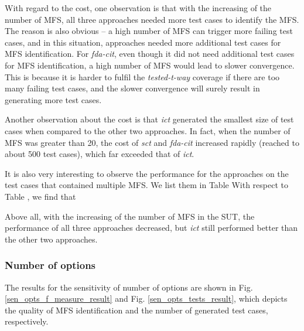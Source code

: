 \documentclass[10pt,journal,compsoc]{IEEEtran}
\begin{document}
With regard to the cost, one observation is that with the increasing of the number of MFS, all three approaches needed more test cases to identify the MFS. The reason is also obvious -- a high number of MFS can trigger more failing test cases, and in this situation, approaches needed more additional test cases for MFS identification. For \emph{fda-cit}, even though it did not need additional test cases for MFS identification, a high number of MFS would lead to slower convergence. This is because it is harder to fulfil the \emph{tested-t-way} coverage if there are too many failing test cases, and the slower convergence will surely result in generating more test cases.


Another observation about the cost is that \emph{ict} generated the smallest size of test cases when compared to the other two approaches. In fact, when the number of MFS was greater than 20, the cost of \emph{sct} and \emph{fda-cit} increased rapidly (reached to about 500 test cases), which far exceeded that of \emph{ict}.


{\color{blue}
It is also very interesting to observe the performance for the approaches on the test cases that contained multiple MFS. We list them in Table
With respect to Table , we find that

}



Above all, with the increasing of the number of MFS in the SUT, the performance of all three approaches decreased, but \emph{ict} still performed better than the other two approaches.


\subsubsection{Number of options}
The results for the sensitivity of number of options are shown in Fig. \ref{sen_opts_f_measure_result} and Fig. \ref{sen_opts_tests_result}, which depicts the quality of MFS identification and the number of generated test cases, respectively.
\end{document}

